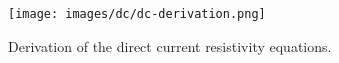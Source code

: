 \begin{figure}[ht]
    \centering
    \texttt{[image: images/dc/dc-derivation.png]}
    \caption{Derivation of the direct current resistivity equations.}
    \label{fig:dc-derivation}
\end{figure}
